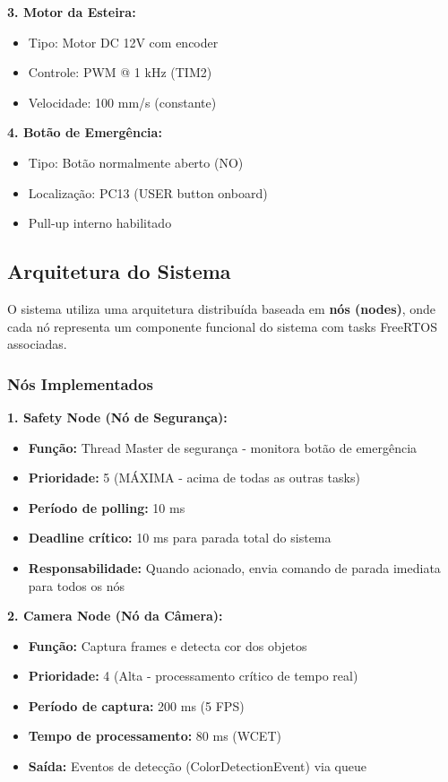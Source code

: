 \documentclass[12pt,a4paper]{article}
\begin{document}
\textbf{3. Motor da Esteira:}
\begin{itemize}
    \item Tipo: Motor DC 12V com encoder
    \item Controle: PWM @ 1 kHz (TIM2)
    \item Velocidade: 100 mm/s (constante)
\end{itemize}

\textbf{4. Botão de Emergência:}
\begin{itemize}
    \item Tipo: Botão normalmente aberto (NO)
    \item Localização: PC13 (USER button onboard)
    \item Pull-up interno habilitado
\end{itemize}

\subsection{Arquitetura do Sistema}

O sistema utiliza uma arquitetura distribuída baseada em \textbf{nós (nodes)}, onde cada nó representa um componente funcional do sistema com tasks FreeRTOS associadas.

\subsubsection{Nós Implementados}

\textbf{1. Safety Node (Nó de Segurança):}
\begin{itemize}
    \item \textbf{Função:} Thread Master de segurança - monitora botão de emergência
    \item \textbf{Prioridade:} 5 (MÁXIMA - acima de todas as outras tasks)
    \item \textbf{Período de polling:} 10 ms
    \item \textbf{Deadline crítico:} 10 ms para parada total do sistema
    \item \textbf{Responsabilidade:} Quando acionado, envia comando de parada imediata para todos os nós
\end{itemize}

\textbf{2. Camera Node (Nó da Câmera):}
\begin{itemize}
    \item \textbf{Função:} Captura frames e detecta cor dos objetos
    \item \textbf{Prioridade:} 4 (Alta - processamento crítico de tempo real)
    \item \textbf{Período de captura:} 200 ms (5 FPS)
    \item \textbf{Tempo de processamento:} 80 ms (WCET)
    \item \textbf{Saída:} Eventos de detecção (ColorDetectionEvent) via queue
\end{itemize}
\end{document}
